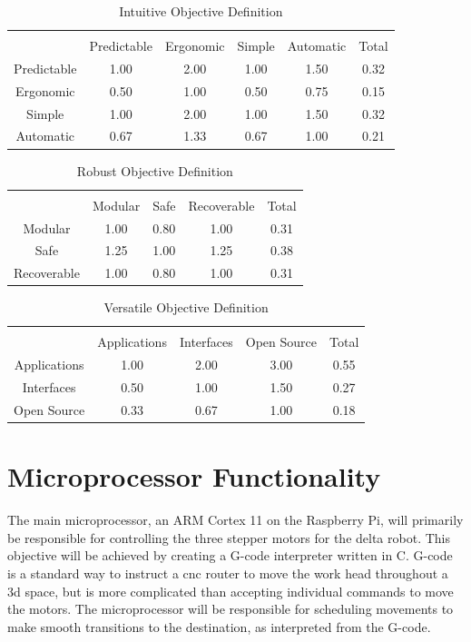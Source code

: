 \documentclass[11pt]{report}
\begin{document}
\begin{table}[ht] 
	\caption{Intuitive Objective Definition}
	\label{table:intuitive}
	\centering 
	\begin{tabular}{c c c c c c} 
		\hline\hline \\
		 			& Predictable	& Ergonomic	& Simple 		& Automatic 	& Total\\ 
		Predictable 	& 1.00 		& 2.00 		& 1.00 		& 1.50 		& 0.32 \\ 
		Ergonomic		& 0.50 		& 1.00 		& 0.50		& 0.75 		& 0.15 \\ 
		Simple	 	& 1.00 		& 2.00 		& 1.00 		& 1.50 		& 0.32 \\ 
		Automatic	 	& 0.67		& 1.33 		& 0.67 		& 1.00 		& 0.21 \\ 
	\end{tabular} 
\end{table}

\begin{table}[ht] 
	\caption{Robust Objective Definition}
	\label{table:robust}
	\centering 
	\begin{tabular}{c c c c c} 
		\hline\hline \\
		 			& Modular 	& Safe 		& Recoverable	& Total\\ 
		Modular	 	& 1.00 		& 0.80		& 1.00 		& 0.31 \\ 
		Safe 		& 1.25		& 1.00 		& 1.25		& 0.38 \\ 
		Recoverable 	& 1.00 		& 0.80 		& 1.00 		& 0.31 \\ 
	\end{tabular} 
\end{table}

\begin{table}[ht] 
	\caption{Versatile Objective Definition}
	\label{table:versatile}
	\centering 
	\begin{tabular}{c c c c c} 
		\hline\hline \\
		 			& Applications& Interfaces	& Open Source	& Total\\ 
		Applications	& 1.00 		& 2.00		& 3.00 		& 0.55 \\ 
		Interfaces	& 0.50		& 1.00 		& 1.50		& 0.27 \\ 
		Open Source 	& 0.33 		& 0.67 		& 1.00 		& 0.18 \\ 
	\end{tabular} 
\end{table}

\section{Microprocessor Functionality}
The main microprocessor, an ARM Cortex 11 on the Raspberry Pi, will primarily be responsible for controlling the three stepper motors for the delta robot.
This objective will be achieved by creating a G-code interpreter written in C.
G-code is a standard way to instruct a \gls{cnc} router to move the work head throughout a \gls{3d} space, but is more complicated than accepting individual commands to move the motors.
The microprocessor will be responsible for scheduling movements to make smooth transitions to the destination, as interpreted from the G-code.
\end{document}
